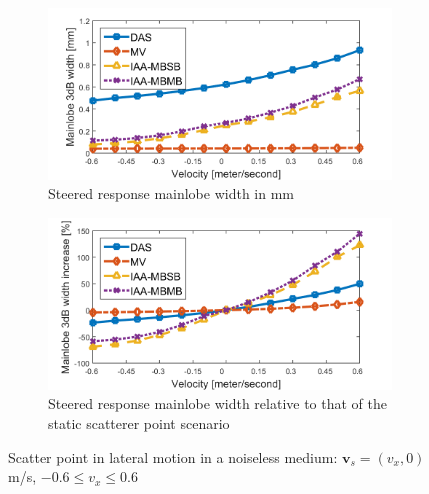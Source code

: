 \begin{figure}[ht]
    \centering
    \begin{subfigure}[t]{\linewidth}
        \includegraphics[width=\linewidth]{./images/results/2.1/mainlobe_width_65.png}
        \caption{Steered response mainlobe width in mm}
        \label{fig:width_vs_velocity_a}
    \end{subfigure}
    \quad
    \begin{subfigure}[t]{\linewidth}
        \includegraphics[width=\linewidth]{./images/results/2.1/mainlobe_width_65_rel.png}
        \caption{Steered response mainlobe width relative to that of the static scatterer point scenario}
        \label{fig:width_vs_velocity_b}
    \end{subfigure}
	\caption{Scatter point in lateral motion in a noiseless medium: $\boldsymbol{v}_s = (v_x, 0)~$m/s, $-0.6 \leq v_x \leq 0.6$}
	\label{fig:width_vs_velocity}
\end{figure}

